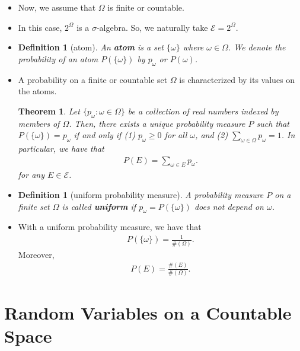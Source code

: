 \documentclass[10pt]{article}
\newtheorem{theorem}[lemma]{Theorem}
\newtheorem{definition}[lemma]{Definition}
\numberwithin{lemma}{section}
\newcommand{\mcal}[1]{\mathcal{#1}}
\begin{document}
\begin{itemize}
  \item Now, we assume that $\Omega$ is finite or countable.
  
  \item In this case, $2^\Omega$ is a $\sigma$-algebra. So, we naturally take $\mcal{E} = 2^\Omega$.
  
  \item \begin{definition}[atom]
    An {\bf atom} is a set $\{ \omega \}$ where $\omega \in \Omega$. We denote the probability of an atom $P(\{ \omega\})$ by $p_\omega$ or $P(\omega)$. 
  \end{definition}

  \item A probability on a finite or countable set $\Omega$ is characterized by its values on the atoms.
  \begin{theorem}
    Let $\{ p_\omega : \omega \in \Omega \}$ be a collection of real numbers indexed by members of $\Omega$. Then, there exists a unique probability measure $P$ such that $P(\{ \omega \}) = p_\omega$ if and only if (1) $p_\omega \geq 0$ for all $\omega$, and (2) $\sum_{\omega \in \Omega} p_\omega = 1$. In particular, we have that
    \begin{align*}
      P(E) = \sum_{\omega \in E} p_\omega.
    \end{align*}
    for any $E \in \mcal{E}$.  
  \end{theorem}

  \item \begin{definition}[uniform probability measure]
    A probability measure $P$ on a finite set $\Omega$ is called {\bf uniform} if $p_\omega = P(\{ \omega \})$ does not depend on $\omega$.
  \end{definition}

  \item With a uniform probability measure, we have that
  \begin{align*}
    P(\{ \omega \}) = \frac{1}{\#(\Omega)}.
  \end{align*}
  Moreover,
  \begin{align*}
    P(E) = \frac{\#(E)}{\#(\Omega)}.
  \end{align*}
\end{itemize}

\section{Random Variables on a Countable Space}
\end{document}
